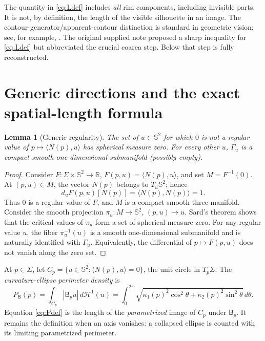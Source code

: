 \documentclass[10pt,a4paper]{article}
\newtheorem{lemma}[theorem]{Lemma}
\theoremstyle{remark}\newtheorem{remark}[theorem]{Remark}
\newcommand{\Sph}{\mathbb S^2}
\newcommand{\HH}{\mathcal H}
\newcommand{\Bop}{\mathsf B}
\begin{document}
The quantity in \eqref{eq:Ldef} includes \emph{all} rim components, including invisible parts. It is not, by definition, the length of the visible silhouette in an image. The contour-generator/apparent-contour distinction is standard in geometric vision; see, for example, \cite{PlantingaVegter}. The original supplied note proposed a sharp inequality for \eqref{eq:Ldef} but abbreviated the crucial coarea step. Below that step is fully reconstructed.

\section{Generic directions and the exact spatial-length formula}
\begin{lemma}[Generic regularity]\label{lem:generic}
The set of $u\in\Sph$ for which $0$ is not a regular value of $p\mapsto\langle N(p),u\rangle$ has spherical measure zero. For every other $u$, $\Gamma_u$ is a compact smooth one-dimensional submanifold (possibly empty).
\end{lemma}
\begin{proof}
Consider $F:\Sigma\times\Sph\to\mathbb R$, $F(p,u)=\langle N(p),u\rangle$, and set $M=F^{-1}(0)$. At $(p,u)\in M$, the vector $N(p)$ belongs to $T_u\Sph$; hence
\[
 d_uF(p,u)[N(p)]=\langle N(p),N(p)\rangle=1.
\]
Thus $0$ is a regular value of $F$, and $M$ is a compact smooth three-manifold. Consider the smooth projection $\pi_u:M\to\Sph$, $(p,u)\mapsto u$. Sard's theorem shows that the critical values of $\pi_u$ form a set of spherical measure zero. For any regular value $u$, the fiber $\pi_u^{-1}(u)$ is a smooth one-dimensional submanifold and is naturally identified with $\Gamma_u$. Equivalently, the differential of $p\mapsto F(p,u)$ does not vanish along the zero set.\qedhere
\end{proof}

At $p\in\Sigma$, let $C_p=\{u\in\Sph:\langle N(p),u\rangle=0\}$, the unit circle in $T_p\Sigma$. The \emph{curvature-ellipse perimeter density} is
\begin{equation}\label{eq:Pdef}
P_\Bop(p)=\int_{C_p}|\Bop_pu|\,d\HH^1(u)
=\int_0^{2\pi}\sqrt{\kappa_1(p)^2\cos^2\theta+
\kappa_2(p)^2\sin^2\theta}\,d\theta.
\end{equation}
Equation \eqref{eq:Pdef} is the length of the \emph{parametrized} image of $C_p$ under $\Bop_p$. It remains the definition when an axis vanishes: a collapsed ellipse is counted with its limiting parametrized perimeter.
\end{document}
